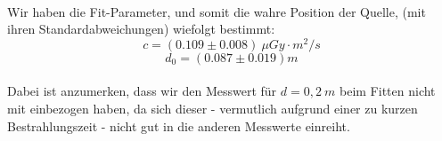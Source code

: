 \begin{center}
	\minipanf    
        \label{fig:Abstandsquadrat}
    \minipend
    \vspace{5mm}
\end{center}
\ \\
Wir haben die Fit-Parameter, und somit die wahre Position der Quelle, (mit ihren Standardabweichungen) wiefolgt bestimmt:
\begin{equation*}
		c = (0.109 \pm 0.008)\ \mu Gy \cdot m^2/s
\end{equation*}
\begin{equation*}
		d_0 = (0.087 \pm 0.019) m
\end{equation*}
\ \\
Dabei ist anzumerken, dass wir den Messwert für $d=0,2\ m$ beim Fitten nicht mit einbezogen haben, da sich dieser - vermutlich aufgrund einer zu kurzen Bestrahlungszeit - nicht gut in die anderen Messwerte einreiht.

